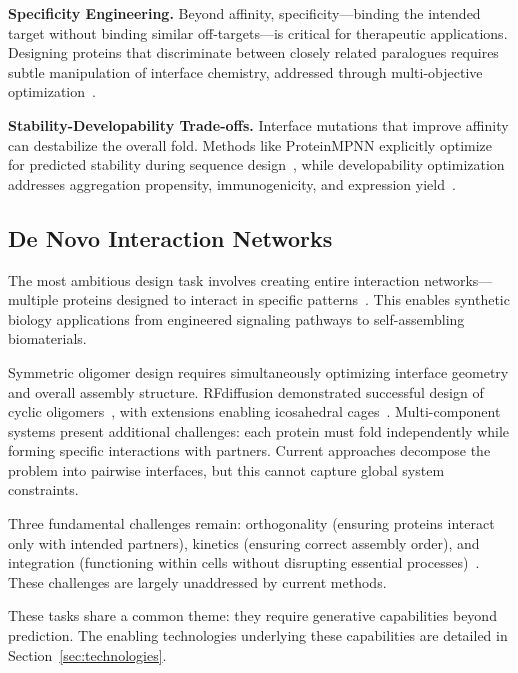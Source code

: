 \textbf{Specificity Engineering.} Beyond affinity, specificity---binding the intended target without binding similar off-targets---is critical for therapeutic applications. Designing proteins that discriminate between closely related paralogues requires subtle manipulation of interface chemistry, addressed through multi-objective optimization~\cite{rodrigues2019mcsm}.

\textbf{Stability-Developability Trade-offs.} Interface mutations that improve affinity can destabilize the overall fold. Methods like ProteinMPNN explicitly optimize for predicted stability during sequence design~\cite{dauparas2022proteinmpnn}, while developability optimization addresses aggregation propensity, immunogenicity, and expression yield~\cite{raybould2019developability}.

\subsection{De Novo Interaction Networks}

The most ambitious design task involves creating entire interaction networks---multiple proteins designed to interact in specific patterns~\cite{watson2023rfdiffusion}. This enables synthetic biology applications from engineered signaling pathways to self-assembling biomaterials.

Symmetric oligomer design requires simultaneously optimizing interface geometry and overall assembly structure. RFdiffusion demonstrated successful design of cyclic oligomers~\cite{watson2023rfdiffusion}, with extensions enabling icosahedral cages~\cite{bennett2024symmetric}. Multi-component systems present additional challenges: each protein must fold independently while forming specific interactions with partners. Current approaches decompose the problem into pairwise interfaces, but this cannot capture global system constraints.

Three fundamental challenges remain: orthogonality (ensuring proteins interact only with intended partners), kinetics (ensuring correct assembly order), and integration (functioning within cells without disrupting essential processes)~\cite{bennett2024symmetric}. These challenges are largely unaddressed by current methods.

\vspace{0.5em}
\noindent
These tasks share a common theme: they require generative capabilities beyond prediction. The enabling technologies underlying these capabilities are detailed in Section~\ref{sec:technologies}.
